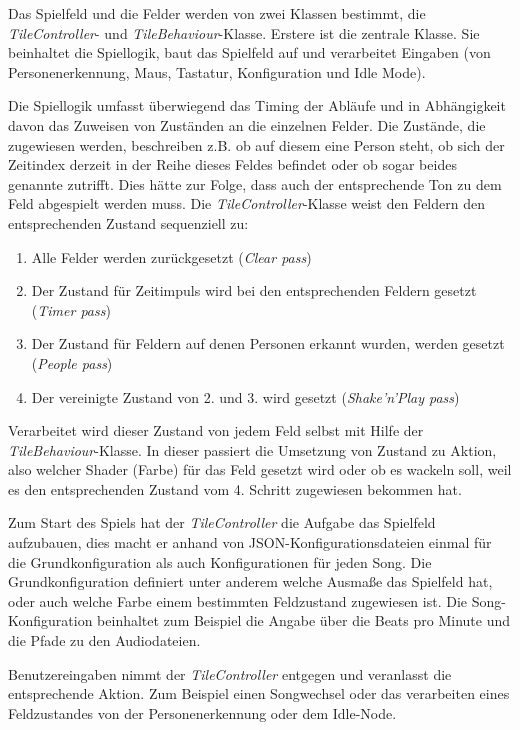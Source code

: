 \label{sec:tiles}

Das Spielfeld und die Felder werden von zwei Klassen bestimmt, die \emph{TileController}- und \emph{TileBehaviour}-Klasse. Erstere ist die zentrale Klasse. Sie beinhaltet die Spiellogik, baut das Spielfeld auf und verarbeitet Eingaben (von Personenerkennung, Maus, Tastatur, Konfiguration und Idle Mode).

Die Spiellogik umfasst überwiegend das Timing der Abläufe und in Abhängigkeit davon das Zuweisen von Zuständen an die einzelnen Felder. Die Zustände, die zugewiesen werden, beschreiben z.B. ob auf diesem eine Person steht, ob sich der Zeitindex derzeit in der Reihe dieses Feldes befindet oder ob sogar beides genannte zutrifft. Dies hätte zur Folge, dass auch der entsprechende Ton zu dem Feld abgespielt werden muss. Die \emph{TileController}-Klasse weist den Feldern den entsprechenden Zustand sequenziell zu:

\begin{enumerate}
\item Alle Felder werden zurückgesetzt (\emph{Clear pass})
\item Der Zustand für Zeitimpuls wird bei den entsprechenden Feldern gesetzt (\emph{Timer pass})
\item Der Zustand für Feldern auf denen Personen erkannt wurden, werden gesetzt (\emph{People pass})
\item Der vereinigte Zustand von 2. und 3. wird gesetzt (\emph{Shake'n'Play pass})
\end{enumerate}

Verarbeitet wird dieser Zustand von jedem Feld selbst mit Hilfe der \emph{TileBehaviour}-Klasse. In dieser passiert die Umsetzung von Zustand zu Aktion, also welcher Shader (Farbe) für das Feld gesetzt wird oder ob es wackeln soll, weil es den entsprechenden Zustand vom 4. Schritt zugewiesen bekommen hat.

Zum Start des Spiels hat der \emph{TileController} die Aufgabe das Spielfeld aufzubauen, dies macht er anhand von JSON-Konfigurationsdateien einmal für die Grundkonfiguration als auch Konfigurationen für jeden Song. Die Grundkonfiguration definiert unter anderem welche Ausmaße das Spielfeld hat, oder auch welche Farbe einem bestimmten Feldzustand zugewiesen ist. Die Song-Konfiguration beinhaltet zum Beispiel die Angabe über die Beats pro Minute und die Pfade zu den Audiodateien.

Benutzereingaben nimmt der \emph{TileController} entgegen und veranlasst die entsprechende Aktion. Zum Beispiel einen Songwechsel oder das verarbeiten eines Feldzustandes von der Personenerkennung oder dem Idle-Node.


